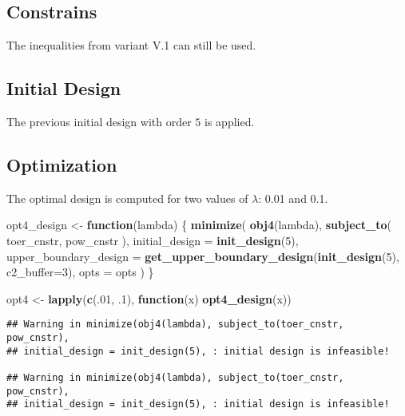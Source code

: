 \documentclass[]{book}
\newenvironment{Shaded}{\begin{snugshade}}{\end{snugshade}}
\newcommand{\ControlFlowTok}[1]{\textcolor[rgb]{0.13,0.29,0.53}{\textbf{#1}}}
\newcommand{\DataTypeTok}[1]{\textcolor[rgb]{0.13,0.29,0.53}{#1}}
\newcommand{\DecValTok}[1]{\textcolor[rgb]{0.00,0.00,0.81}{#1}}
\newcommand{\FloatTok}[1]{\textcolor[rgb]{0.00,0.00,0.81}{#1}}
\newcommand{\KeywordTok}[1]{\textcolor[rgb]{0.13,0.29,0.53}{\textbf{#1}}}
\newcommand{\NormalTok}[1]{#1}
\newcommand{\StringTok}[1]{\textcolor[rgb]{0.31,0.60,0.02}{#1}}
\begin{document}
\hypertarget{constrains-13}{%
\subsection{Constrains}\label{constrains-13}}

The inequalities from variant V.1 can still be used.

\hypertarget{initial-design-12}{%
\subsection{Initial Design}\label{initial-design-12}}

The previous initial design with order \(5\) is applied.

\hypertarget{optimization-12}{%
\subsection{Optimization}\label{optimization-12}}

The optimal design is computed for two values of \(\lambda\): 0.01 and 0.1.

\begin{Shaded}
\begin{Highlighting}[]
\NormalTok{opt4_design <-}\StringTok{ }\ControlFlowTok{function}\NormalTok{(lambda) \{}
    \KeywordTok{minimize}\NormalTok{(}
        \KeywordTok{obj4}\NormalTok{(lambda),}
        \KeywordTok{subject_to}\NormalTok{(}
\NormalTok{            toer_cnstr,}
\NormalTok{            pow_cnstr}
\NormalTok{        ),}
        \DataTypeTok{initial_design =} \KeywordTok{init_design}\NormalTok{(}\DecValTok{5}\NormalTok{),}
        \DataTypeTok{upper_boundary_design =} \KeywordTok{get_upper_boundary_design}\NormalTok{(}\KeywordTok{init_design}\NormalTok{(}\DecValTok{5}\NormalTok{), }\DataTypeTok{c2_buffer=}\DecValTok{3}\NormalTok{),}
        \DataTypeTok{opts =}\NormalTok{ opts}
\NormalTok{    )}
\NormalTok{\}}

\NormalTok{opt4 <-}\StringTok{ }\KeywordTok{lapply}\NormalTok{(}\KeywordTok{c}\NormalTok{(.}\DecValTok{01}\NormalTok{, }\FloatTok{.1}\NormalTok{), }\ControlFlowTok{function}\NormalTok{(x) }\KeywordTok{opt4_design}\NormalTok{(x))}
\end{Highlighting}
\end{Shaded}

\begin{verbatim}
## Warning in minimize(obj4(lambda), subject_to(toer_cnstr, pow_cnstr),
## initial_design = init_design(5), : initial design is infeasible!

## Warning in minimize(obj4(lambda), subject_to(toer_cnstr, pow_cnstr),
## initial_design = init_design(5), : initial design is infeasible!
\end{verbatim}
\end{document}
